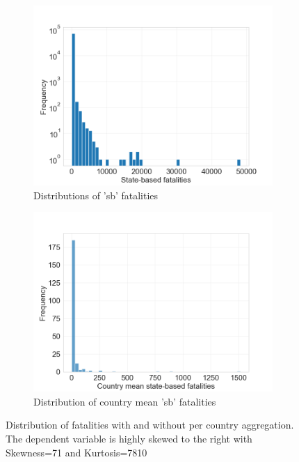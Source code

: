 \documentclass[runningheads]{llncs}
\begin{document}
\begin{figure}[htbp]
        \begin{subfigure}[b]{0.49\textwidth}
            \centering
            \includegraphics[width=\textwidth]{Figures/ged_sb_distribution.png}
            \caption{Distributions of 'sb' fatalities}
            \label{fig:histogram_ged_sb}
        \end{subfigure}
        \hfill
        \begin{subfigure}[b]{0.49\textwidth}
            \centering
            \includegraphics[width=\textwidth]{Figures/per_country_mean_ged_sb_distribution.png}
            \caption{Distribution of country mean 'sb' fatalities}
            \label{fig:histogram_mean_ged_sb}
        \end{subfigure}

        \caption{Distribution of fatalities with and without per country aggregation. The dependent variable is highly skewed to the right with Skewness=71 and Kurtosis=7810}
        \label{fig:dist_fatalities}
    \end{figure}
\end{document}
